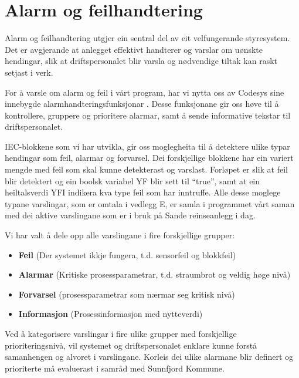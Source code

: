 \newpage
\section{Alarm og feilhandtering}
\thispagestyle{fancy}

Alarm og feilhandtering utgjer ein sentral del av eit velfungerande styresystem. Det er avgjerande
at anlegget effektivt handterer og varslar om uønskte hendingar, slik at 
driftspersonalet blir varsla og nødvendige tiltak kan raskt setjast i verk.

For å varsle om alarm og feil i vårt program, har vi nytta oss av \gls{Codesys} sine
innebygde alarmhandteringsfunksjonar \citep{CodesysAlarm}. Desse funksjonane gir oss høve til å 
kontrollere, gruppere og prioritere alarmar, samt å sende informative tekstar til driftspersonalet.

\gls{IEC}-blokkene som vi har utvikla, gir oss moglegheita til å detektere ulike typar hendingar
som feil, alarmar og forvarsel.
Dei forskjellige blokkene har ein variert mengde med feil som skal kunne detekterast og varslast.
Forløpet er slik at feil blir detektert og ein boolsk variabel \gls{YF} blir sett til ``true'', 
samt at ein heiltalsverdi \gls{YFI} indikera kva type feil som har inntruffe.\newline
Alle desse moglege typane varslingar, som er omtala i vedlegg E, 
er samla i programmet vårt saman 
med dei aktive varslingane som er i bruk på Sande reinseanlegg i dag.

Vi har valt å dele opp alle varslingane i fire forskjellige grupper:

\begin{itemize}
    \item \textbf{Feil}          (Der systemet ikkje fungera, t.d. sensorfeil og blokkfeil)
    \item \textbf{Alarmar}       (Kritiske prosessparametrar, t.d. straumbrot og veldig høge nivå)
    \item \textbf{Forvarsel}     (prosessparametrar som nærmar seg kritisk nivå)
    \item \textbf{Informasjon}   (Prosessinformasjon med nytteverdi)
\end{itemize}

Ved å kategorisere varslingar i fire ulike grupper med forskjellige prioriteringsnivå,
vil systemet og driftspersonalet enklare kunne forstå samanhengen og alvoret i varslingane. \newline
Korleis dei ulike alarmane blir definert og prioriterte må evaluerast i samråd med \gls{Sunnfjord Kommune}.

\newpage

